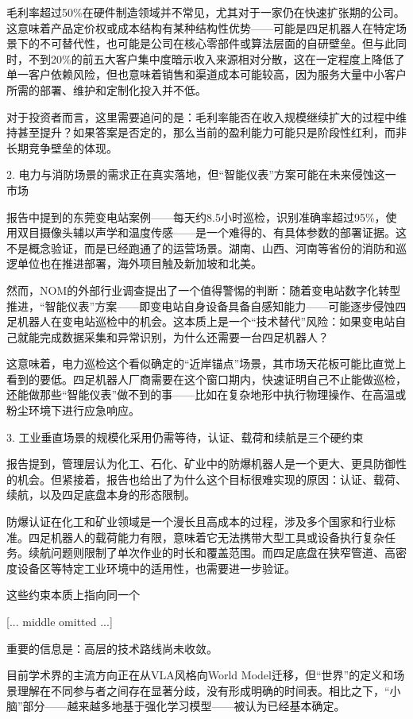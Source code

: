 \documentclass[11pt]{ctexart}
\begin{document}
毛利率超过50\%在硬件制造领域并不常见，尤其对于一家仍在快速扩张期的公司。这意味着产品定价权或成本结构有某种结构性优势——可能是四足机器人在特定场景下的不可替代性，也可能是公司在核心零部件或算法层面的自研壁垒。但与此同时，不到20\%的前五大客户集中度暗示收入来源相对分散，这在一定程度上降低了单一客户依赖风险，但也意味着销售和渠道成本可能较高，因为服务大量中小客户所需的部署、维护和定制化投入并不低。

对于投资者而言，这里需要追问的是：毛利率能否在收入规模继续扩大的过程中维持甚至提升？如果答案是否定的，那么当前的盈利能力可能只是阶段性红利，而非长期竞争壁垒的体现。

2. 电力与消防场景的需求正在真实落地，但“智能仪表”方案可能在未来侵蚀这一市场

报告中提到的东莞变电站案例——每天约8.5小时巡检，识别准确率超过95\%，使用双目摄像头辅以声学和温度传感——是一个难得的、有具体参数的部署证据。这不是概念验证，而是已经跑通了的运营场景。湖南、山西、河南等省份的消防和巡逻单位也在推进部署，海外项目触及新加坡和北美。

然而，NOM的外部行业调查提出了一个值得警惕的判断：随着变电站数字化转型推进，“智能仪表”方案——即变电站自身设备具备自感知能力——可能逐步侵蚀四足机器人在变电站巡检中的机会。这本质上是一个“技术替代”风险：如果变电站自己就能完成数据采集和异常识别，为什么还需要一台四足机器人？

这意味着，电力巡检这个看似确定的“近岸锚点”场景，其市场天花板可能比直觉上看到的要低。四足机器人厂商需要在这个窗口期内，快速证明自己不止能做巡检，还能做那些“智能仪表”做不到的事——比如在复杂地形中执行物理操作、在高温或粉尘环境下进行应急响应。

3. 工业垂直场景的规模化采用仍需等待，认证、载荷和续航是三个硬约束

报告提到，管理层认为化工、石化、矿业中的防爆机器人是一个更大、更具防御性的机会。但紧接着，报告也给出了为什么这个目标很难实现的原因：认证、载荷、续航，以及四足底盘本身的形态限制。

防爆认证在化工和矿业领域是一个漫长且高成本的过程，涉及多个国家和行业标准。四足机器人的载荷能力有限，意味着它无法携带大型工具或设备执行复杂任务。续航问题则限制了单次作业的时长和覆盖范围。而四足底盘在狭窄管道、高密度设备区等特定工业环境中的适用性，也需要进一步验证。

这些约束本质上指向同一个

[... middle omitted ...]

重要的信息是：高层的技术路线尚未收敛。

目前学术界的主流方向正在从VLA风格向World Model迁移，但“世界”的定义和场景理解在不同参与者之间存在显著分歧，没有形成明确的时间表。相比之下，“小脑”部分——越来越多地基于强化学习模型——被认为已经基本确定。
\end{document}

